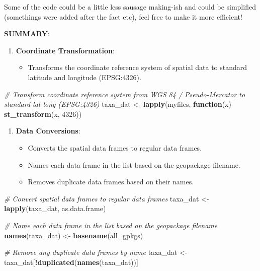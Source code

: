 \documentclass[
]{book}
\newenvironment{Shaded}{\begin{snugshade}}{\end{snugshade}}
\newcommand{\CommentTok}[1]{\textcolor[rgb]{0.56,0.35,0.01}{\textit{#1}}}
\newcommand{\ControlFlowTok}[1]{\textcolor[rgb]{0.13,0.29,0.53}{\textbf{#1}}}
\newcommand{\DecValTok}[1]{\textcolor[rgb]{0.00,0.00,0.81}{#1}}
\newcommand{\FunctionTok}[1]{\textcolor[rgb]{0.13,0.29,0.53}{\textbf{#1}}}
\newcommand{\NormalTok}[1]{#1}
\newcommand{\OtherTok}[1]{\textcolor[rgb]{0.56,0.35,0.01}{#1}}
\newcommand{\SpecialCharTok}[1]{\textcolor[rgb]{0.81,0.36,0.00}{\textbf{#1}}}
\providecommand{\tightlist}{%
  \setlength{\itemsep}{0pt}\setlength{\parskip}{0pt}}
\theoremstyle{definition}
\theoremstyle{definition}
\theoremstyle{definition}
\theoremstyle{definition}
\theoremstyle{remark}
\begin{document}
Some of the code could be a little less sausage making-ish and could be simplified (somethings were added after the fact etc), feel free to make it more efficient!

\textbf{SUMMARY}:

\begin{enumerate}
\def\labelenumi{\arabic{enumi}.}
\tightlist
\item
  \textbf{Coordinate Transformation}:

  \begin{itemize}
  \tightlist
  \item
    Transforms the coordinate reference system of spatial data to standard latitude and longitude (EPSG:4326).
  \end{itemize}
\end{enumerate}

\begin{Shaded}
\begin{Highlighting}[]
\CommentTok{\# Transform coordinate reference system from WGS 84 / Pseudo{-}Mercator to standard lat long (EPSG:4326)}
\NormalTok{taxa\_dat }\OtherTok{\textless{}{-}} \FunctionTok{lapply}\NormalTok{(myfiles, }\ControlFlowTok{function}\NormalTok{(x) }\FunctionTok{st\_transform}\NormalTok{(x, }\DecValTok{4326}\NormalTok{))}
\end{Highlighting}
\end{Shaded}

\begin{enumerate}
\def\labelenumi{\arabic{enumi}.}
\setcounter{enumi}{1}
\tightlist
\item
  \textbf{Data Conversions}:

  \begin{itemize}
  \tightlist
  \item
    Converts the spatial data frames to regular data frames.
  \item
    Names each data frame in the list based on the geopackage filename.
  \item
    Removes duplicate data frames based on their names.
  \end{itemize}
\end{enumerate}

\begin{Shaded}
\begin{Highlighting}[]
\CommentTok{\# Convert spatial data frames to regular data frames}
\NormalTok{taxa\_dat }\OtherTok{\textless{}{-}} \FunctionTok{lapply}\NormalTok{(taxa\_dat, as.data.frame)}

\CommentTok{\# Name each data frame in the list based on the geopackage filename}
\FunctionTok{names}\NormalTok{(taxa\_dat) }\OtherTok{\textless{}{-}} \FunctionTok{basename}\NormalTok{(all\_gpkgs)}

\CommentTok{\# Remove any duplicate data frames by name}
\NormalTok{taxa\_dat }\OtherTok{\textless{}{-}}\NormalTok{ taxa\_dat[}\SpecialCharTok{!}\FunctionTok{duplicated}\NormalTok{(}\FunctionTok{names}\NormalTok{(taxa\_dat))]}
\end{Highlighting}
\end{Shaded}
\end{document}
